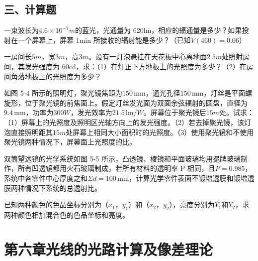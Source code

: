 \documentclass[padl, analysis, notocnum]{ExBook}
\newcommand{\answerarea}[1][3.5cm]{%
  \par\vspace{1mm}%
  \noindent{\color{themeColor!35}\rule{\linewidth}{0.4pt}}\par
  \noindent\begin{minipage}[t][#1][t]{\linewidth}\vspace{0pt}\end{minipage}\par
  \noindent{\color{themeColor!35}\rule{\linewidth}{0.4pt}}\par
}
\begin{document}
\subsection{三、计算题}
\begin{qitems}[startnum=1]
\qitem 一束波长为$4.6\times 10^{-7}m$的蓝光，光通量为 620lm，相应的辐通量是多少？如果投射在一个屏幕上，屏幕 1min 所接收的辐射能是多少？（已知$V(460)=0.06$）
\label{q:103:start}
\answerarea[7.0cm]
\label{q:103:end}
\end{qitems}

\begin{qitems}[startnum=2]
\qitem 一房间长$5m$，宽$3m$，高$3m$。设有一灯泡悬挂在天花板中心离地面$2.5m$处照射房间，其发光强度为 60cd，求：（1）在灯正下方地板上的光照度为多少？（2）在房间角落地板上的光照度为多少？
\label{q:104:start}
\answerarea[7.0cm]
\label{q:104:end}
\end{qitems}

\begin{qitems}[startnum=3]
\qitem 如图 5-4 所示的照明灯，聚光镜焦距为$150\,\mathrm{mm}$，通光孔径$150\,\mathrm{mm}$，灯丝是平面螺旋形，位于聚光镜的前焦面上。假定灯丝发光面为双面余弦辐射的圆盘，直径为$9.4\,\mathrm{mm}$，功率为$300W$，发光效率为$21.5\,\mathrm{lm}/W$。屏幕位于聚光镜后$15m$处。试求：（1）屏幕上的光照度及照明区光轴方向上的发光强度。（2）若去掉聚光镜，该灯泡直接照明距其$15m$处屏幕上相同大小面积时的光照度。（3）使用聚光镜和不使用聚光镜两种情况下，屏幕面上光照度的比。
\label{q:105:start}
\answerarea[2.4cm]
\label{q:105:end}
\end{qitems}

\begin{qitems}[startnum=4]
\qitem 双筒望远镜的光学系统如图 5-5 所示，凸透镜、棱镜和平面玻璃均用冕牌玻璃制作，所有凹透镜都用火石玻璃制成，若所有材料的透明率 P 相同，且$P=0.985$，系统中各零件中心厚度之和$\Sigma d=100\,\mathrm{mm}$，计算光学零件表面不镀增透膜和镀增透膜两种情况下系统的总透射比。
\label{q:106:start}
\answerarea[2.4cm]
\label{q:106:end}
\end{qitems}

\begin{qitems}[startnum=5]
\qitem 已知两种颜色的色品坐标分别为（$x_{1}$，$y_{1}$）和（$x_{2}$，$y_{2}$），亮度分别为$Y_{1}$和$Y_{2}$，求两种颜色相加混合色的色品坐标和亮度。
\label{q:107:start}
\answerarea[7.0cm]
\label{q:107:end}
\end{qitems}

\section{第六章\quad 光线的光路计算及像差理论}
\end{document}
